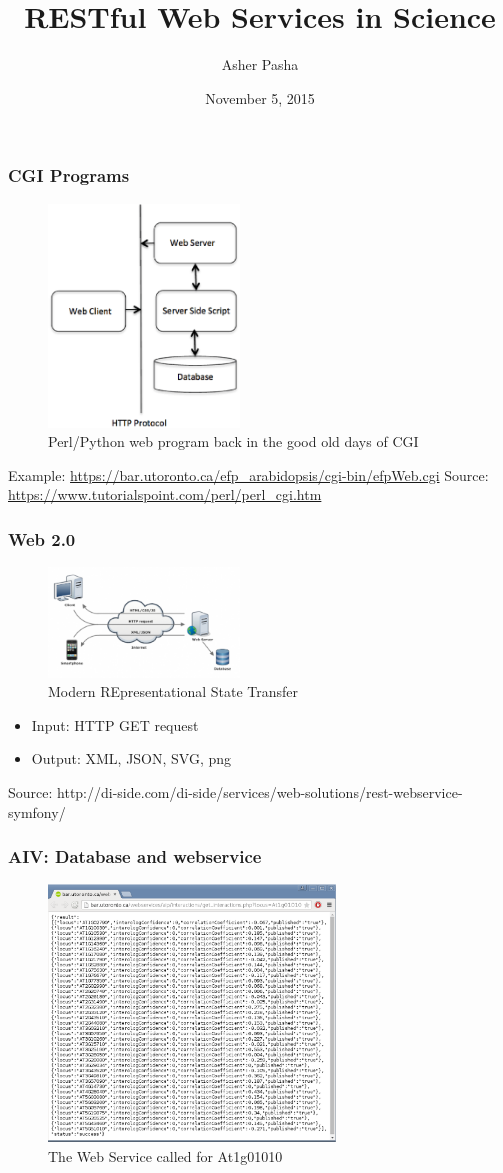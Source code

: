 \documentclass{beamer}
\title{RESTful Web Services in Science}
\author{Asher Pasha}
\institute{University of Toronto}
\date{November 5, 2015}
\begin{document}
	\frame{\titlepage}

	\begin{frame}
		\frametitle{CGI Programs}
		\begin{figure}[!htb]
			\centering
			\includegraphics[width=2in]{cgiarch.eps}
			\caption{Perl/Python web program back in the good old days of CGI}
		\end{figure}
		Example: \url{https://bar.utoronto.ca/efp\_arabidopsis/cgi-bin/efpWeb.cgi}
		{\tiny Source: \url{https://www.tutorialspoint.com/perl/perl\_cgi.htm}}
	\end{frame}

	\begin{frame}
		\frametitle{Web 2.0}
		\begin{figure}[!htb]
			\centering
			\includegraphics[width=2in]{REST.eps}
			\caption{Modern REpresentational State Transfer}
		\end{figure}
		\begin{itemize}
			\item Input: HTTP GET request
			\item Output: XML, JSON, SVG, png
		\end{itemize}
		{\tiny Source: http://di-side.com/di-side/services/web-solutions/rest-webservice-symfony/}			
	\end{frame}

	\begin{frame}
		\frametitle{AIV: Database and webservice}
		\begin{figure}[!htb]
			\centering
			\includegraphics[width=3in]{webservice.eps}
			\caption{The Web Service called for At1g01010}
		\end{figure}
	\end{frame}
\end{document}
